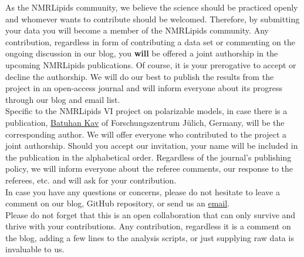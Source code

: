 \documentclass[12pt]{article}
\begin{document}
As the NMRLipids community, we believe the science should be practiced openly and whomever wants to contribute should be welcomed. Therefore, by submitting your data you will become a member of the NMRLipids community. Any contribution, regardless in form of contributing a data set or commenting on the ongoing discussion in our blog, you \textbf{will} be offered a joint authorship in the upcoming NMRLipids publications. Of course, it is your prerogative to accept or decline the authorship. We will do our best to publish the results from the project in an open-access journal and will inform everyone about its progress through our blog and email list.\\

Specific to the NMRLipids VI project on polarizable models, in case there is a publication, \href{http://www.strodel.info/bkav.php}{Batuhan Kav} of Forschungszentrum Jülich, Germany, will be the corresponding author. We will offer everyone who contributed to the project a joint authorship. Should you accept our invitation, your name will be included in the publication in the alphabetical order. Regardless of the journal's publishing policy, we will inform everyone about the referee comments, our response to the referees, etc. and will ask for your contribution.\\

In case you have any questions or concerns, please do not hesitate to leave a comment on our blog, GitHub repository, or send us an \href{mailto:b.kav@fz-juelich.de}{email}.\\

Please do not forget that this is an open collaboration that can only survive and thrive with your contributions. Any contribution, regardless it is a comment on the blog, adding a few lines to the analysis scripts, or just supplying raw data is invaluable to us.\\



\end{document}
